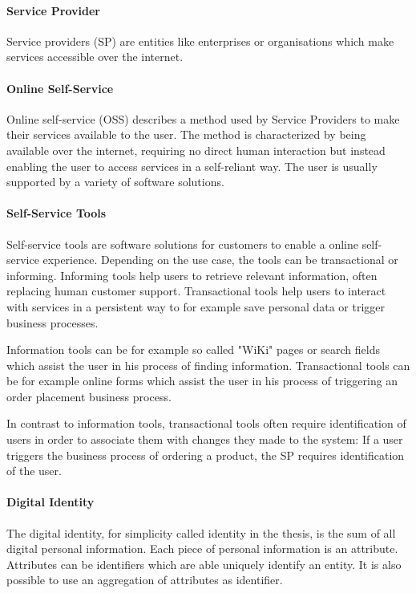 
\paragraph{Service Provider}
Service providers (SP) are entities like enterprises or organisations which make services accessible over the internet.

\paragraph{Online Self-Service}
Online self-service (OSS) describes a method used by Service Providers to make their services available to the user. The method is characterized by being available over the internet, requiring no direct human interaction but instead enabling the user to access services in a self-reliant way. The user is usually supported by a variety of software solutions.

\paragraph{Self-Service Tools}
Self-service tools are software solutions for customers to enable a online self-service experience. Depending on the use case, the tools can be transactional or informing. Informing tools help users to retrieve relevant information, often replacing human customer support. Transactional tools help users to interact with services in a persistent way to for example save personal data or trigger business processes.

Information tools can be for example so called "WiKi" pages or search fields which assist the user in his process of finding information. Transactional tools can be for example online forms which assist the user in his process of triggering an order placement business process.

In contrast to information tools, transactional tools often require identification of users in order to associate them with changes they made to the system: If a user triggers the business process of ordering a product, the SP requires identification of the user.

\paragraph{Digital Identity}
The digital identity, for simplicity called identity in the thesis, is the sum of all digital personal information. Each piece of personal information is an attribute. Attributes can be identifiers which are able uniquely identify an entity. It is also possible to use an aggregation of attributes as identifier.

